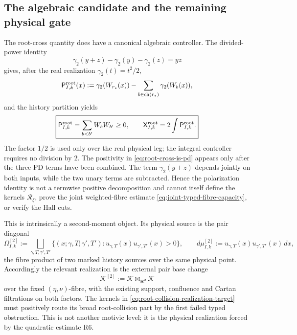 \documentclass[11pt]{article}
\newcommand{\R}{\mathbf R}
\begin{document}
\subsection{The algebraic candidate and the remaining physical gate}

The root-cross quantity does have a canonical algebraic controller.  The
divided-power identity
\[
 \gamma_2(y+z)-\gamma_2(y)-\gamma_2(z)=yz
\]
gives, after the real realization \(\gamma_2(t)=t^2/2\),
\begin{equation}\label{eq:root-pd-polarization}
 \mathsf P^{\rm root}_{I,k}(x)
 :=
 \gamma_2(W_{r_\ast}(x))
 -
 \sum_{b\in\operatorname{ch}(r_\ast)}\gamma_2(W_b(x)),
\end{equation}
and the history partition yields
\begin{equation}\label{eq:root-cross-is-pd}
 \boxed{
 \mathsf P^{\rm root}_{I,k}
 =\sum_{b<b'}W_bW_{b'}\ge0,
 \qquad
 \mathsf X^{\rm root}_{I,k}
 =2\int\mathsf P^{\rm root}_{I,k}.}
\end{equation}
The factor \(1/2\) is used only over the real physical leg; the integral
controller requires no division by \(2\).  The positivity in
\eqref{eq:root-cross-is-pd} appears only after the three PD terms have been
combined.  The term \(\gamma_2(y+z)\) depends jointly on both inputs, while the
two unary terms are subtracted.  Hence the polarization identity is not a
termwise positive decomposition and cannot itself define the kernels
\(\mathcal R_\xi\), prove the joint weighted-fibre estimate
\eqref{eq:joint-typed-fibre-capacity}, or verify the Hall cuts.

This is intrinsically a second-moment object.  Its physical source is the pair
diagonal
\begin{equation}\label{eq:physical-pair-diagonal}
 \Omega^{[2]}_{I,k}
 :=
 \bigsqcup_{\gamma,T,\gamma',T'}
 \{(x;\gamma,T;\gamma',T'):
       u_{\gamma,T}(x)u_{\gamma',T'}(x)>0\},
 \qquad
 d\mu^{[2]}_{I,k}
 :=
 u_{\gamma,T}(x)u_{\gamma',T'}(x)\,dx,
\end{equation}
the fibre product of two marked history sources over the same physical point.
Accordingly the relevant realization is the external pair base change
\begin{equation}\label{eq:pair-filtered-realization}
 \mathcal K^{[2]}:=\mathcal K\boxtimes_{\R^d}\mathcal K
\end{equation}
over the fixed \((\eta,\nu)\)-fibre, with the existing support, confluence and
Cartan filtrations on both factors.  The kernels in
\eqref{eq:root-collision-realization-target} must positively route its broad
root-collision part by the first failed typed obstruction.  This is not another
motivic level: it is the physical realization forced by the quadratic
estimate R6.
\end{document}
